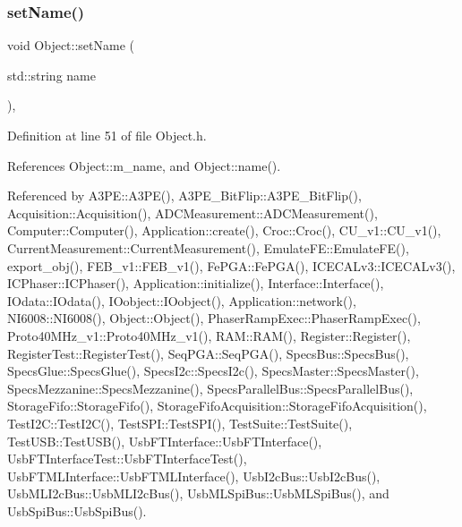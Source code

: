 \subsubsection{\texorpdfstring{set\+Name()}{setName()}}
{\footnotesize\ttfamily void Object\+::set\+Name (\begin{DoxyParamCaption}\item[{std\+::string}]{name }\end{DoxyParamCaption})\hspace{0.3cm}{\ttfamily [inline]}, {\ttfamily [inherited]}}



Definition at line 51 of file Object.\+h.



References Object\+::m\+\_\+name, and Object\+::name().



Referenced by A3\+P\+E\+::\+A3\+P\+E(), A3\+P\+E\+\_\+\+Bit\+Flip\+::\+A3\+P\+E\+\_\+\+Bit\+Flip(), Acquisition\+::\+Acquisition(), A\+D\+C\+Measurement\+::\+A\+D\+C\+Measurement(), Computer\+::\+Computer(), Application\+::create(), Croc\+::\+Croc(), C\+U\+\_\+v1\+::\+C\+U\+\_\+v1(), Current\+Measurement\+::\+Current\+Measurement(), Emulate\+F\+E\+::\+Emulate\+F\+E(), export\+\_\+obj(), F\+E\+B\+\_\+v1\+::\+F\+E\+B\+\_\+v1(), Fe\+P\+G\+A\+::\+Fe\+P\+G\+A(), I\+C\+E\+C\+A\+Lv3\+::\+I\+C\+E\+C\+A\+Lv3(), I\+C\+Phaser\+::\+I\+C\+Phaser(), Application\+::initialize(), Interface\+::\+Interface(), I\+Odata\+::\+I\+Odata(), I\+Oobject\+::\+I\+Oobject(), Application\+::network(), N\+I6008\+::\+N\+I6008(), Object\+::\+Object(), Phaser\+Ramp\+Exec\+::\+Phaser\+Ramp\+Exec(), Proto40\+M\+Hz\+\_\+v1\+::\+Proto40\+M\+Hz\+\_\+v1(), R\+A\+M\+::\+R\+A\+M(), Register\+::\+Register(), Register\+Test\+::\+Register\+Test(), Seq\+P\+G\+A\+::\+Seq\+P\+G\+A(), Specs\+Bus\+::\+Specs\+Bus(), Specs\+Glue\+::\+Specs\+Glue(), Specs\+I2c\+::\+Specs\+I2c(), Specs\+Master\+::\+Specs\+Master(), Specs\+Mezzanine\+::\+Specs\+Mezzanine(), Specs\+Parallel\+Bus\+::\+Specs\+Parallel\+Bus(), Storage\+Fifo\+::\+Storage\+Fifo(), Storage\+Fifo\+Acquisition\+::\+Storage\+Fifo\+Acquisition(), Test\+I2\+C\+::\+Test\+I2\+C(), Test\+S\+P\+I\+::\+Test\+S\+P\+I(), Test\+Suite\+::\+Test\+Suite(), Test\+U\+S\+B\+::\+Test\+U\+S\+B(), Usb\+F\+T\+Interface\+::\+Usb\+F\+T\+Interface(), Usb\+F\+T\+Interface\+Test\+::\+Usb\+F\+T\+Interface\+Test(), Usb\+F\+T\+M\+L\+Interface\+::\+Usb\+F\+T\+M\+L\+Interface(), Usb\+I2c\+Bus\+::\+Usb\+I2c\+Bus(), Usb\+M\+L\+I2c\+Bus\+::\+Usb\+M\+L\+I2c\+Bus(), Usb\+M\+L\+Spi\+Bus\+::\+Usb\+M\+L\+Spi\+Bus(), and Usb\+Spi\+Bus\+::\+Usb\+Spi\+Bus().


